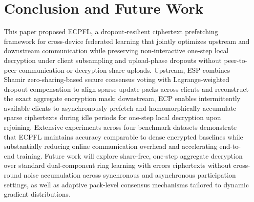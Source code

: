 \section{Conclusion and Future Work}
\label{sec:conclusion}

This paper proposed \textsc{ECPFL}, a dropout-resilient ciphertext prefetching framework for cross-device federated learning that jointly optimizes upstream and downstream communication while preserving non-interactive one-step local decryption under client subsampling and upload-phase dropouts without peer-to-peer communication or decryption-share uploads. Upstream, \textsc{ESP} combines Shamir zero-sharing-based secure consensus voting with Lagrange-weighted dropout compensation to align sparse update packs across clients and reconstruct the exact aggregate encryption mask; downstream, \textsc{ECP} enables intermittently available clients to asynchronously prefetch and homomorphically accumulate sparse ciphertexts during idle periods for one-step local decryption upon rejoining. Extensive experiments across four benchmark datasets demonstrate that \textsc{ECPFL} maintains accuracy comparable to dense encrypted baselines while substantially reducing online communication overhead and accelerating end-to-end training. Future work will explore share-free, one-step aggregate decryption over standard dual-component ring learning with errors ciphertexts without cross-round noise accumulation across synchronous and asynchronous participation settings, as well as adaptive pack-level consensus mechanisms tailored to dynamic gradient distributions.

